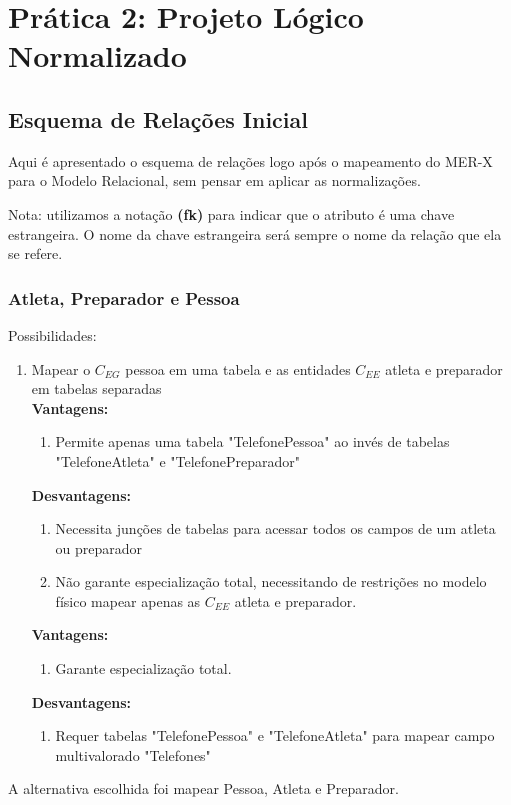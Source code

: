 \documentclass[12pt,a4paper]{article}
\begin{document}
\section{Prática 2: Projeto Lógico Normalizado}\label{sec:mrel}

\subsection{Esquema de Relações Inicial}
    
    Aqui é apresentado o esquema de relações logo após o mapeamento do MER-X para o Modelo Relacional, sem pensar em aplicar as normalizações.
    
    Nota: utilizamos a notação {\bf (fk)} para indicar que o atributo é uma chave estrangeira. O nome da chave estrangeira será sempre o nome da relação que ela se refere.
    
    \singlespacing

    \subsubsection{Atleta, Preparador e Pessoa}
    Possibilidades:
    \begin{enumerate}
    \item Mapear o $C_{EG}$ pessoa em uma tabela e as entidades $C_{EE}$ atleta e preparador em tabelas separadas \\
    \textbf{Vantagens:} \begin{enumerate}
        \item Permite apenas uma tabela "TelefonePessoa" ao invés de tabelas "TelefoneAtleta" e "TelefonePreparador"
        \end{enumerate}
    \textbf{Desvantagens:} \begin{enumerate}
        \item Necessita junções de tabelas para acessar todos os campos de um atleta ou preparador
        \item Não garante especialização total, necessitando de restrições no modelo físico
    mapear apenas as $C_{EE}$ atleta e preparador.
        \end{enumerate}
    \textbf{Vantagens:} \begin{enumerate}
        \item Garante especialização total.
        \end{enumerate}
    \textbf{Desvantagens:} \begin{enumerate}
        \item Requer tabelas "TelefonePessoa" e "TelefoneAtleta" para mapear campo multivalorado "Telefones"
        \end{enumerate}
    \end{enumerate}
    A alternativa escolhida foi mapear Pessoa, Atleta e Preparador.
    
\end{document}
